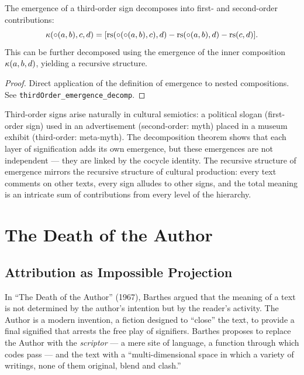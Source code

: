 \begin{theorem}
\label{thm:third-order-decomp}
The emergence of a third-order sign decomposes into first- and
second-order contributions:
\[
  \kappa(\circ(a, b), c, d) =
  [\mathrm{rs}(\circ(\circ(a,b), c), d)
  - \mathrm{rs}(\circ(a,b), d) - \mathrm{rs}(c, d)].
\]
This can be further decomposed using the emergence of the inner
composition $\kappa(a, b, d)$, yielding a recursive structure.
\end{theorem}

\begin{proof}
Direct application of the definition of emergence to nested
compositions. See \texttt{thirdOrder\_emergence\_decomp}.
\end{proof}

\begin{interpretation}
Third-order signs arise naturally in cultural semiotics: a political
slogan (first-order sign) used in an advertisement (second-order: myth)
placed in a museum exhibit (third-order: meta-myth). The decomposition
theorem shows that each layer of signification adds its own emergence,
but these emergences are not independent --- they are linked by the
cocycle identity. The recursive structure of emergence mirrors the
recursive structure of cultural production: every text comments on
other texts, every sign alludes to other signs, and the total meaning
is an intricate sum of contributions from every level of
the hierarchy.
\end{interpretation}

\section{The Death of the Author}

\subsection{Attribution as Impossible Projection}

In ``The Death of the Author'' (1967), Barthes argued that the meaning
of a text is not determined by the author's intention but by the
reader's activity. The Author is a modern invention, a fiction designed
to ``close'' the text, to provide a final signified that arrests the
free play of signifiers. Barthes proposes to replace the Author with
the \emph{scriptor} --- a mere site of language, a function through
which codes pass --- and the text with a ``multi-dimensional space in
which a variety of writings, none of them original, blend and clash.''

